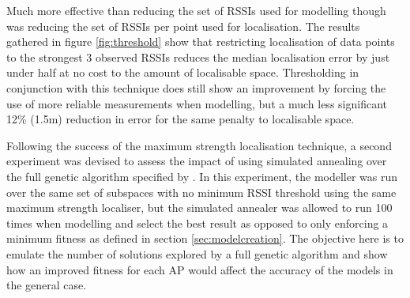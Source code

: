 \documentclass{UoYCSproject}
\begin{document}
                Much more effective than reducing the set of RSSIs used for modelling though was reducing the set of RSSIs per point used for localisation. The results gathered in figure \ref{fig:threshold} show that restricting localisation of data points to the strongest 3 observed RSSIs reduces the median localisation error by just under half at no cost to the amount of localisable space. Thresholding in conjunction with this technique does still show an improvement by forcing the use of more reliable measurements when modelling, but a much less significant 12\% (1.5m) reduction in error for the same penalty to localisable space.
                
                Following the success of the maximum strength localisation technique, a second experiment was devised to assess the impact of using simulated annealing over the full genetic algorithm specified by \citet{chintalapudi2010indoor}. In this experiment, the modeller was run over the same set of subspaces with no minimum RSSI threshold using the same maximum strength localiser, but the simulated annealer was allowed to run 100 times when modelling and select the best result as opposed to only enforcing a minimum fitness as defined in section \ref{sec:modelcreation}. The objective here is to emulate the number of solutions explored by a full genetic algorithm and show how an improved fitness for each AP would affect the accuracy of the models in the general case.
                  
\end{document}
